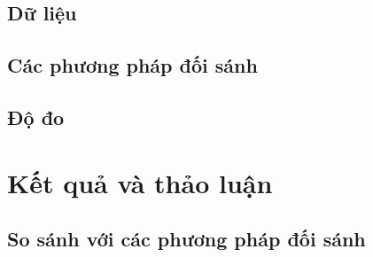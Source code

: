\documentclass[10pt, conference, a4paper, compsocconf]{IEEEtran}
\begin{document}
\subsection{Dữ liệu}

\subsection{Các phương pháp đối sánh}

\subsection{Độ đo}

\section{Kết quả và thảo luận}

\subsection{So sánh với các phương pháp đối sánh}
\end{document}
